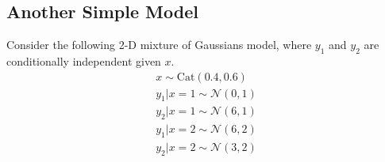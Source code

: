\subsection{Another Simple Model}
Consider the following 2-D mixture of Gaussians model, where $y_{1}$ and $y_{2}$ are conditionally independent given $x$. 
\begin{align}
x \sim \text{Cat}(0.4,0.6)\\
y_{1} | x = 1 \sim \mathcal{N}(0,1)\\
y_{2} | x = 1 \sim \mathcal{N}(6,1)\\
y_{1} | x = 2 \sim \mathcal{N}(6,2)\\
y_{2} | x = 2 \sim \mathcal{N}(3,2)
\end{align}
